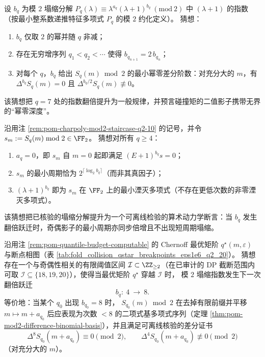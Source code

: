 \begin{conjecture}\label{conj:pom-mod2-collapse-exponent-tower}
设 \(b_q\) 为模 \(2\) 塌缩分解
\(
P_q(\lambda)\equiv \lambda^{a_q}(\lambda+1)^{b_q}\ (\mathrm{mod}\ 2)
\)
中 \((\lambda+1)\) 的指数（按最小整系数递推特征多项式 \(P_q\) 的模 \(2\) 约化定义）。
猜想：
\begin{enumerate}
\normalfont
  \item \(b_q\) 仅取 \(2\) 的幂并随 \(q\) 非减；
  \item 存在无穷增序列 \(q_1<q_2<\cdots\) 使得 \(b_{q_{n+1}}=2\,b_{q_n}\)；
  \item 对每个 \(q\)，\(b_q\) 给出 \(S_q(m)\bmod 2\) 的最小幂零差分阶数：对充分大的 \(m\)，有 \(\Delta^{b_q}S_q(m)=0\) 且 \(\Delta^{b_q/2}S_q(m)\not\equiv 0\)。
\end{enumerate}
该猜想把 \(q=7\) 处的指数翻倍提升为一般规律，并预言碰撞矩的二值影子携带无界的“幂零深度”。
\end{conjecture}

\begin{conjecture}[模 \(2\) 影子周期的无前段与满周期机制]\label{conj:pom-mod2-shadow-no-preperiod-full-period}
沿用注 \ref{rem:pom-charpoly-mod2-staircase-q2-10} 的记号，并令 \(s_m:=S_q(m)\bmod 2\in\FF_2\)。
猜想对所有 \(q\ge 4\)：
\begin{enumerate}
\normalfont
  \item \(a_q=0\)，即 \(s_m\) 自 \(m=0\) 起即满足 \((E+1)^{b_q}s=0\)；
  \item \(s_m\) 的最小周期恰为 \(2^{\lceil\log_2 b_q\rceil}\)（而非其真因子）；
  \item \((\lambda+1)^{b_q}\) 即为 \(s_m\) 在 \(\FF_2\) 上的最小湮灭多项式（不存在更低次数的非零湮灭多项式）。
\end{enumerate}
该猜想把已核验的塌缩分解提升为一个可离线检验的算术动力学断言：当 \(b_q\) 发生翻倍跃迁时，奇偶影子的最小周期亦同步倍增且不出现短周期塌缩。
\end{conjecture}

\begin{conjecture}\label{conj:pom-mod2-bq-next-jump-locks-to-qstar}
沿用注 \ref{rem:pom-quantile-budget-computable} 的 Chernoff 最优矩阶 \(q^\star(m,\varepsilon)\) 与断点相图（表 \ref{tab:fold_collision_qstar_breakpoints_eps1e6_q2_20}）。
猜想存在一个与奇偶性相关的有限阈值区间 \(\mathcal{I}\subset\ZZ_{\ge 2}\)（在已审计的 DP 截断范围内可取 \(\mathcal{I}\subseteq\{18,19,20\}\)），使得当最优矩阶 \(q^\star\) 穿越 \(\mathcal{I}\) 时，
模 \(2\) 塌缩指数发生下一次翻倍跃迁
\[
b_q:\ 4\ \longrightarrow\ 8.
\]
等价地：当某个 \(q_0\) 出现 \(b_{q_0}=8\) 时，
\(S_{q_0}(m)\bmod 2\) 在去掉有限前缀并平移 \(m\mapsto m+a_{q_0}\) 后应表现为次数 \(<8\) 的二项式基多项式序列（定理 \ref{thm:pom-mod2-difference-binomial-basis}），并且满足可离线核验的差分证书
\[
\Delta^{8}S_{q_0}(m+a_{q_0})\equiv 0\pmod 2,
\qquad
\Delta^{4}S_{q_0}(m+a_{q_0})\not\equiv 0\pmod 2
\]
（对充分大的 \(m\)）。
\end{conjecture}

\endinput
